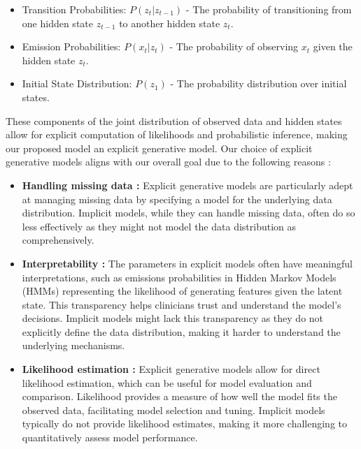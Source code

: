 \begin{itemize}
    \item Transition Probabilities: \(P(z_t | z_{t-1})\) - The probability of transitioning from one hidden state \(z_{t-1}\) to another hidden state \(z_t\).

    \item Emission Probabilities: \(P(x_t | z_t)\) - The probability of observing \(x_t\) given the hidden state \(z_t\).

    \item Initial State Distribution: \(P(z_1)\) - The probability distribution over initial states.
\end{itemize}
These components of the joint distribution of observed data and hidden states allow for explicit computation of likelihoods and probabilistic inference, making our proposed model an explicit generative model. Our choice of explicit generative models aligns with our overall goal due to the following reasons : 
\begin{itemize}
    \item \textbf{Handling missing data :} Explicit generative models are particularly adept at managing missing data by specifying a model for the underlying data distribution. Implicit models, while they can handle missing data, often do so less effectively as they might not model the data distribution as comprehensively.

    \item \textbf{Interpretability :} The parameters in explicit models often have meaningful interpretations, such as emissions probabilities in Hidden Markov Models (HMMs) representing the likelihood of generating features given the latent state. This transparency helps clinicians trust and understand the model’s decisions. Implicit models might lack this transparency as they do not explicitly define the data distribution, making it harder to understand the underlying mechanisms.

    \item \textbf{Likelihood estimation :} Explicit generative models allow for direct likelihood estimation, which can be useful for model evaluation and comparison. Likelihood provides a measure of how well the model fits the observed data, facilitating model selection and tuning. Implicit models typically do not provide likelihood estimates, making it more challenging to quantitatively assess model performance.
\end{itemize}